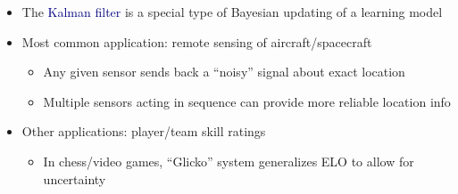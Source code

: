 \documentclass[aspectratio=169]{beamer}
\begin{document}
\begin{frame}

\begin{itemize}
\itemsep1.5em
\item<1-> The \textcolor{navy}{Kalman filter} is a special type of Bayesian updating of a learning model

\item<2-> Most common application: remote sensing of aircraft/spacecraft
\bigskip\par
\begin{itemize}
\itemsep1.5em
\item<3-> Any given sensor sends back a ``noisy'' signal about exact location

\item<4-> Multiple sensors acting in sequence can provide more reliable location info
\end{itemize}


\item<5-> Other applications: player/team skill ratings
\bigskip\par
\begin{itemize}
\itemsep1.5em
\item<6-> In chess/video games, ``Glicko'' system generalizes ELO to allow for uncertainty

\end{itemize}
\end{itemize}

\end{frame}
\end{document}
